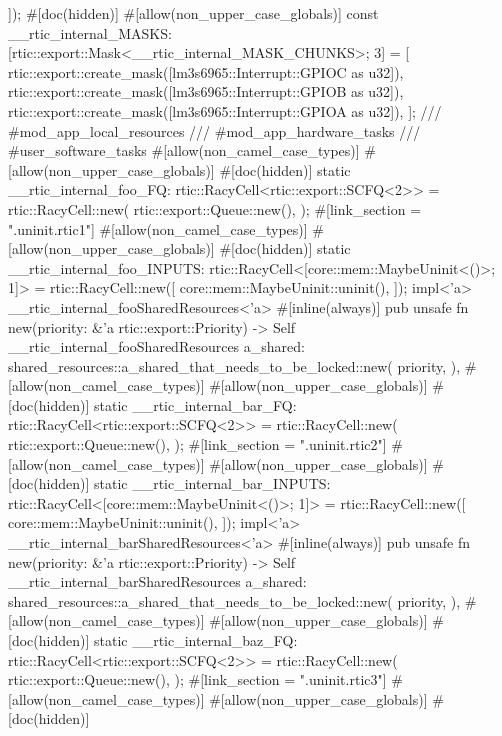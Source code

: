 {    ]);
    #[doc(hidden)]
    #[allow(non_upper_case_globals)]
    const __rtic_internal_MASKS: [rtic::export::Mask<__rtic_internal_MASK_CHUNKS>; 3] = [
        rtic::export::create_mask([lm3s6965::Interrupt::GPIOC as u32]),
        rtic::export::create_mask([lm3s6965::Interrupt::GPIOB as u32]),
        rtic::export::create_mask([lm3s6965::Interrupt::GPIOA as u32]),
    ];
    /// #mod_app_local_resources
    /// #mod_app_hardware_tasks
    /// #user_software_tasks
    #[allow(non_camel_case_types)]
    #[allow(non_upper_case_globals)]
    #[doc(hidden)]
    static __rtic_internal_foo_FQ: rtic::RacyCell<rtic::export::SCFQ<2>> = rtic::RacyCell::new(
        rtic::export::Queue::new(),
    );
    #[link_section = ".uninit.rtic1"]
    #[allow(non_camel_case_types)]
    #[allow(non_upper_case_globals)]
    #[doc(hidden)]
    static __rtic_internal_foo_INPUTS: rtic::RacyCell<[core::mem::MaybeUninit<()>; 1]> = rtic::RacyCell::new([
        core::mem::MaybeUninit::uninit(),
    ]);
    impl<'a> __rtic_internal_fooSharedResources<'a> {
        #[inline(always)]
        pub unsafe fn new(priority: &'a rtic::export::Priority) -> Self {
            __rtic_internal_fooSharedResources {
                a_shared: shared_resources::a_shared_that_needs_to_be_locked::new(
                    priority,
                ),
            }
        }
    }
    #[allow(non_camel_case_types)]
    #[allow(non_upper_case_globals)]
    #[doc(hidden)]
    static __rtic_internal_bar_FQ: rtic::RacyCell<rtic::export::SCFQ<2>> = rtic::RacyCell::new(
        rtic::export::Queue::new(),
    );
    #[link_section = ".uninit.rtic2"]
    #[allow(non_camel_case_types)]
    #[allow(non_upper_case_globals)]
    #[doc(hidden)]
    static __rtic_internal_bar_INPUTS: rtic::RacyCell<[core::mem::MaybeUninit<()>; 1]> = rtic::RacyCell::new([
        core::mem::MaybeUninit::uninit(),
    ]);
    impl<'a> __rtic_internal_barSharedResources<'a> {
        #[inline(always)]
        pub unsafe fn new(priority: &'a rtic::export::Priority) -> Self {
            __rtic_internal_barSharedResources {
                a_shared: shared_resources::a_shared_that_needs_to_be_locked::new(
                    priority,
                ),
            }
        }
    }
    #[allow(non_camel_case_types)]
    #[allow(non_upper_case_globals)]
    #[doc(hidden)]
    static __rtic_internal_baz_FQ: rtic::RacyCell<rtic::export::SCFQ<2>> = rtic::RacyCell::new(
        rtic::export::Queue::new(),
    );
    #[link_section = ".uninit.rtic3"]
    #[allow(non_camel_case_types)]
    #[allow(non_upper_case_globals)]
    #[doc(hidden)]
}
